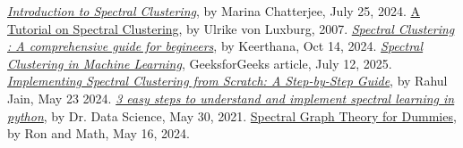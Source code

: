 \documentclass{article}
\begin{document}
\begin{thebibliography}{9}
\href{https://www.mygreatlearning.com/blog/introduction-to-spectral-clustering/}{\textit{Introduction to Spectral Clustering}}, by Marina Chatterjee, July 25, 2024.
\href{https://people.csail.mit.edu/dsontag/courses/ml14/notes/Luxburg07_tutorial_spectral_clustering.pdf}{A Tutorial on Spectral Clustering}, by Ulrike von Luxburg, 2007.
\href{https://www.analyticsvidhya.com/blog/2021/05/what-why-and-how-of-spectral-clustering/}{\textit{Spectral Clustering : A comprehensive guide for begineers}}, by Keerthana, Oct 14, 2024.
\href{https://www.geeksforgeeks.org/machine-learning/ml-spectral-clustering/}{\textit{Spectral Clustering in Machine Learning}}, GeeksforGeeks article, July 12, 2025.
\href{https://rahuljain788.medium.com/implementing-spectral-clustering-from-scratch-a-step-by-step-guide-9643e4836a76}{\textit{Implementing Spectral Clustering from Scratch: A Step-by-Step Guide}}, by Rahul Jain, May 23 2024.
\href{https://youtu.be/YHz0PHcuJnk?si=TLcduWA458duAHzX}{\textit{3 easy steps to understand and implement spectral learning in python}}, by Dr. Data Science, May 30, 2021.
\href{https://youtu.be/uTUVhsxdGS8?si=8sFtW-p11xJVOAMI}{Spectral Graph Theory for Dummies}, by Ron and Math, May 16, 2024.

\end{thebibliography}
\end{document}
